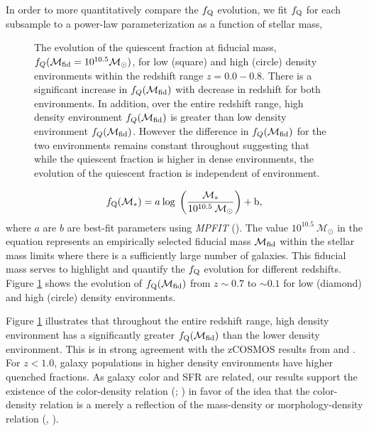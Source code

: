 \documentclass{emulateapj}
\begin{document}
In order to more quantitatively compare the $f_{\rm{Q}}$ evolution, we fit $f_{\rm{Q}}$ for each subsample to a power-law parameterization as a function of stellar mass, 
\begin{figure}
    \begin{center}
        \leavevmode
        \caption{The evolution of the quiescent fraction at fiducial mass, $f_{Q}(\mathcal{M}_{\rm{fid}} = 10^{10.5} \mathcal{M}_\odot)$, for low (square) and high (circle) density environments within the redshift range $z = 0.0 - 0.8$.  There is a significant increase in $f_{Q}(\mathcal{M}_{\rm{fid}})$ with decrease in redshift for both environments. In addition, over the entire redshift range, high density environment $f_{Q}(\mathcal{M}_{\rm{fid}})$ is greater than low density environment $f_{Q}(\mathcal{M}_{\rm{fid}})$. However the difference in $f_{Q}(\mathcal{M}_{\rm{fid}})$ for the two environments remains constant throughout suggesting that while the quiescent fraction is higher in dense environments, the evolution of the quiescent fraction is independent of environment.}         \label{fig:qffit}
    \end{center}
\end{figure}

\begin{equation} 
f_{\rm{Q}}(\mathcal{M}_{*}) = a \: \rm{log} \; \left(\frac{ \mathcal{M}_{*}}{10^{10.5} \: \mathcal{M}_{\odot}} \right)+b,
\end{equation}
where $a$ are $b$ are best-fit parameters using {\em MPFIT} (\cite{Markwardt:2009aa}). The value $10^{10.5} \: \mathcal{M}_{\odot}$ in the equation represents an empirically selected fiducial mass $\mathcal{M}_{\rm{fid}}$ within the stellar mass limits where there is a sufficiently large number of galaxies. This fiducial mass serves to highlight and quantify the $f_{\rm{Q}}$ evolution for different redshifts. Figure \ref{fig:qffit} shows the evolution of $f_{\rm{Q}}(\mathcal{M}_{\rm{fid}})$ from $z \sim 0.7$ to $\sim 0.1$ for low (diamond) and high (circle) density environments. 

Figure \ref{fig:qffit} illustrates that throughout the entire redshift range, high density environment has a significantly greater $f_{\rm{Q}}(\mathcal{M}_{\rm{fid}})$ than the lower density environment. This is in strong agreement with the zCOSMOS results from \cite{Cucciati:2010aa} and \cite{Kovac:2014aa}. For $z < 1.0$, galaxy populations in higher density environments have higher quenched fractions. As galaxy color and SFR are related, our results support the existence of the color-density relation (\cite{Cucciati:2010aa}; \cite{Cooper:2010aa}) in favor of the idea that the color-density relation is a merely a reflection of the mass-density or morphology-density relation (\cite{Scodeggio:2009aa}, \cite{Tasca:2009aa}).  
\end{document}
